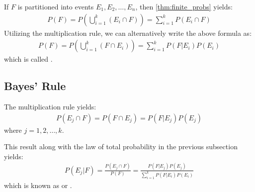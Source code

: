 If \( F \) is partitioned into events \( E_1, E_2, \ldots, E_n \), then \autoref{thm:finite_probs} yields:
\begin{gather*}
	P(F) = P(\bigcup_{i = 1}^{k} (E_i \cap F)) = \sum_{i = 1}^{k} P(E_i \cap F)
\end{gather*}
Utilizing the multiplication rule, we can alternatively write the above formula as:
\begin{gather*}
	P(F) = P(\bigcup_{i = 1}^{k} (F \cap E_i)) = \sum_{i = 1}^{k} P(F | E_i)P(E_i)
\end{gather*}
which is called .

\subsection{Bayes' Rule}

The multiplication rule yields:
\begin{gather*}
	P(E_j \cap F) = P(F \cap E_j) = P(F | E_j)P(E_j)
\end{gather*}
where \( j = 1, 2, \ldots, k \).

This result along with the law of total probability in the previous subsection yields:
\begin{gather*}
	P(E_j | F) = \frac{P(E_j \cap F)}{P(F)} = \frac{P(F | E_j)P(E_j)}{\sum_{i = 1}^{k}P(F | E_i)P(E_i)}
\end{gather*}
which is known as  or .


